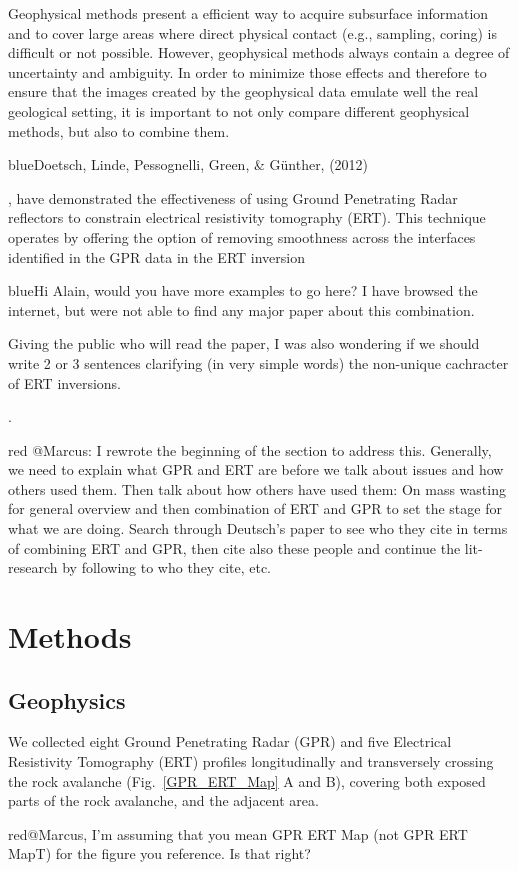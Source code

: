 \documentclass[utf8]{frontiersSCNS}
\newcommand{\COMON}{\begin{color}{blue}}
\newcommand{\COMOFF}{\end{color}}
\newcommand{\alon}{\begin{color}{red}}
\newcommand{\aloff}{\end{color}}
\begin{document}
Geophysical methods present a efficient way to acquire subsurface information and  to cover large areas where direct physical contact (e.g., sampling, coring) is difficult or not possible. However, geophysical methods always contain a degree of  uncertainty and ambiguity. In order to minimize those effects and therefore to ensure that the images created by the geophysical data emulate well the real geological setting, it is important to not only compare different geophysical methods, but also to combine them. \COMON Doetsch, Linde, Pessognelli, Green, \& G\"unther, (2012)\COMOFF, have demonstrated the effectiveness of using Ground Penetrating Radar reflectors to constrain electrical resistivity tomography (ERT). This technique operates by offering the option of removing smoothness across the interfaces identified in the GPR data in the ERT inversion 

\COMON Hi Alain, would you have more examples to go here? I have browsed the internet, but were not able to find any major paper about this combination. 

Giving the public who will read the paper, I was also wondering if we should write 2 or 3 sentences clarifying (in very simple words) the non-unique cachracter of ERT inversions.\COMOFF.

\alon
@Marcus: I rewrote the beginning of the section to address this. Generally, we need to explain what GPR and ERT are before we talk about issues and how others used them. Then talk about how others have used them: On mass wasting for general overview and then combination of ERT and GPR to set the stage for what we are doing. Search through Deutsch's paper to see who they cite in terms of combining ERT and GPR, then cite also these people and continue the lit-research by following to who they cite, etc. 
\aloff






\section{Methods}

\subsection{Geophysics}

We collected eight Ground Penetrating Radar (GPR) and five Electrical Resistivity Tomography (ERT) profiles longitudinally and transversely crossing the rock avalanche (Fig.~\ref{GPR_ERT_Map} A and B), covering both exposed parts of the rock avalanche, and the adjacent area. \alon @Marcus, I'm assuming that you mean GPR ERT Map (not GPR ERT MapT) for the figure you reference. Is that right? \aloff
\end{document}
